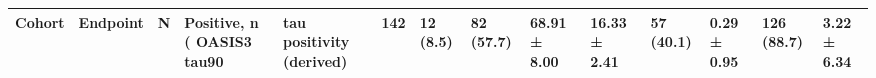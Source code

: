 \begin{tabular}{llrllllllll}
\toprule
Cohort & Endpoint & N & Positive, n (%
\midrule
OASIS3 tau90 & tau positivity (derived) & 142 & 12 (8.5) & 82 (57.7) & 68.91 ± 8.00 & 16.33 ± 2.41 & 57 (40.1) & 0.29 ± 0.95 & 126 (88.7) & 3.22 ± 6.34 \\
\bottomrule
\end{tabular}
